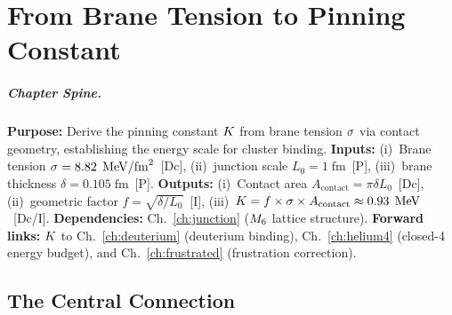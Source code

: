 
\chapter{From Brane Tension to Pinning Constant}
\label{ch:sigma_to_K}


\begin{abstract}
The brane tension $\bsigma$ is the fundamental energy scale of EDC. This chapter
derives the pinning constant $\Kpin$ from $\bsigma$ and contact geometry, establishing
the quantitative link between 5D brane physics and cluster binding energies.
\end{abstract}

\paragraph{Chapter Spine.}
\textbf{Purpose:} Derive the pinning constant $\Kpin$ from brane tension $\bsigma$
via contact geometry, establishing the energy scale for cluster binding.
\textbf{Inputs:} (i)~Brane tension $\sigma = 8.82\;\,\mathrm{MeV}/\text{fm}^2$~[Dc],
(ii)~junction scale $L_0 = 1\;\text{fm}$~[P], (iii)~brane thickness $\delta = 0.105\;\text{fm}$~[P].
\textbf{Outputs:} (i)~Contact area $A_{\text{contact}} = \pi\delta L_0$~[Dc],
(ii)~geometric factor $f = \sqrt{\delta/L_0}$~[I], (iii)~$K = f \times \sigma \times A_{\text{contact}} \approx 0.93\;\,\mathrm{MeV}$~[Dc/I].
\textbf{Dependencies:} Ch.~\ref{ch:junction} ($M_6$ lattice structure).
\textbf{Forward links:} $\Kpin$ to Ch.~\ref{ch:deuterium} (deuterium binding),
Ch.~\ref{ch:helium4} (closed-4 energy budget), and Ch.~\ref{ch:frustrated} (frustration correction).

\section{The Central Connection}
\label{sec:sigmaK:central}

